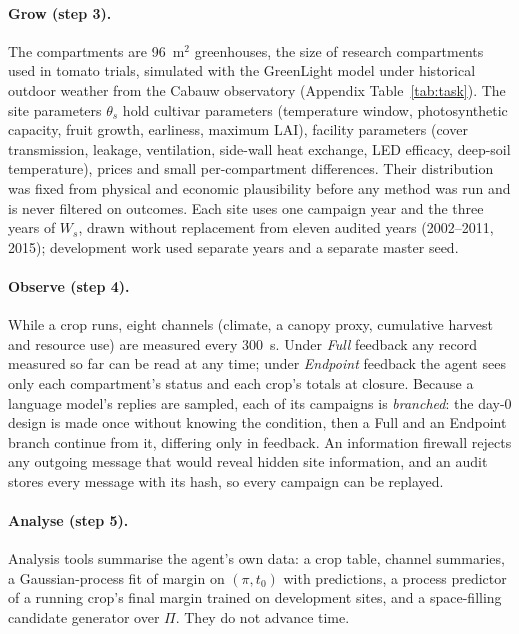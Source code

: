 \paragraph{Grow (step 3).} The compartments are 96~m$^2$ greenhouses, the size of research compartments used in tomato trials, simulated with the GreenLight model \citep{katzin2020greenlight} under historical outdoor weather from the Cabauw observatory \citep{knmi_cabauw,knmi_cabauw_rad} (Appendix Table~\ref{tab:task}). The site parameters $\theta_s$ hold cultivar parameters (temperature window, photosynthetic capacity, fruit growth, earliness, maximum LAI), facility parameters (cover transmission, leakage, ventilation, side-wall heat exchange, LED efficacy, deep-soil temperature), prices and small per-compartment differences. Their distribution was fixed from physical and economic plausibility before any method was run and is never filtered on outcomes. Each site uses one campaign year and the three years of $W_s$, drawn without replacement from eleven audited years (2002--2011, 2015); development work used separate years and a separate master seed.

\paragraph{Observe (step 4).} While a crop runs, eight channels (climate, a canopy proxy, cumulative harvest and resource use) are measured every 300~s. Under \emph{Full} feedback any record measured so far can be read at any time; under \emph{Endpoint} feedback the agent sees only each compartment's status and each crop's totals at closure. Because a language model's replies are sampled, each of its campaigns is \emph{branched}: the day-0 design is made once without knowing the condition, then a Full and an Endpoint branch continue from it, differing only in feedback. An information firewall rejects any outgoing message that would reveal hidden site information, and an audit stores every message with its hash, so every campaign can be replayed.

\paragraph{Analyse (step 5).} Analysis tools summarise the agent's own data: a crop table, channel summaries, a Gaussian-process fit of margin on $(\pi,t_0)$ with predictions, a process predictor of a running crop's final margin trained on development sites, and a space-filling candidate generator over $\Pi$. They do not advance time.

